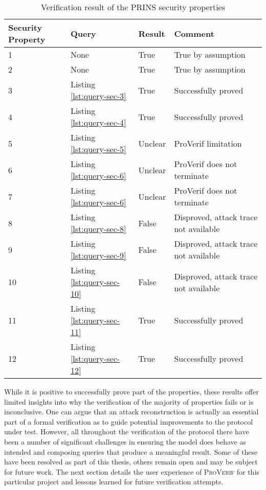 \begin{table}[ht]
    \centering
    \begin{tabular}{l|l|l|l}
    Security Property & Query                                           & Result  & Comment                               \\
    \hline
    1                 & None                                            & True    & True by assumption                    \\
    2                 & None                                            & True    & True by assumption                    \\
    3                 & Listing \ref{lst:query-sec-3}  & True    & Successfully proved                   \\
    4                 & Listing \ref{lst:query-sec-4}  & True    & Successfully proved                   \\
    5                 & Listing \ref{lst:query-sec-5}  & Unclear & ProVerif limitation                   \\
    6                 & Listing \ref{lst:query-sec-6}  & Unclear & ProVerif does not terminate           \\
    7                 & Listing \ref{lst:query-sec-6}  & Unclear & ProVerif does not terminate           \\
    8                 & Listing \ref{lst:query-sec-8}  & False   & Disproved, attack trace not available \\
    9                 & Listing \ref{lst:query-sec-9}  & False   & Disproved, attack trace not available \\
    10                & Listing \ref{lst:query-sec-10} & False   & Disproved, attack trace not available \\
    11                & Listing \ref{lst:query-sec-11} & True    & Successfully proved                   \\
    12                & Listing \ref{lst:query-sec-12} & True    & Successfully proved\\
    \hline
    \end{tabular}
    \caption{Verification result of the PRINS security properties}
    \label{tab:verification-result}
\end{table}

While it is positive to successfully prove part of the properties, these results offer limited insights into why the verification of the majority of properties fails or is inconclusive.
One can argue that an attack reconstruction is actually an essential part of a formal verification as to guide potential improvements to the protocol under test.
However, all throughout the verification of the protocol there have been a number of significant challenges in ensuring the model does behave as intended and composing queries that produce a meaningful result.
Some of these have been resolved as part of this thesis, others remain open and may be subject for future work.
The next section details the user experience of \textsc{ProVerif} for this particular project and lessons learned for future verification attempts.